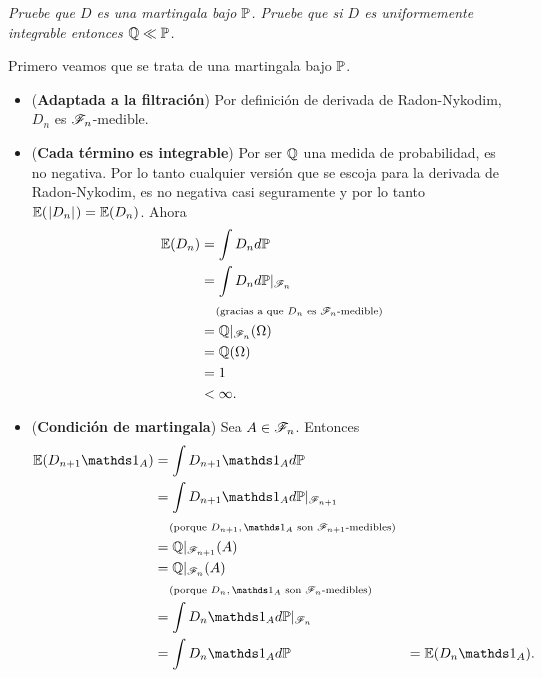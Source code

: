 \emph{
	Pruebe que $D$ es una martingala bajo $\p$. Pruebe que si 
	$D$ es uniformemente integrable entonces $\q\ll\p$.
}

\afterstatement\pn

Primero veamos que se trata de una martingala bajo $\P$.

\begin{itemize}
	\item   (\textbf{Adaptada a la filtración})
        Por definición de derivada de Radon-Nykodim, $D_n$ es $\F_n$-medible.\pn
    
    \item   (\textbf{Cada término es integrable})
        Por ser $\Q$ una medida de probabilidad, es no negativa. Por lo tanto cualquier versión que se
        escoja para la derivada de Radon-Nykodim, es no negativa casi seguramente y por lo tanto
        $\E(\abs{D_n}) = \E(D_n)$. Ahora
        \begin{align}
            \E(D_n)     &=  \int D_n d\P                                    \\
                        &=  \int D_n d\P|_{\F_n}                            \\
                        &\comment{gracias a que $D_n$ es $\F_n$-medible}    \\
                        &=  \Q|_{\F_n}(\Omega)                              \\
                        &=  \Q(\Omega)                                      \\
                        &=  1                                               \\
                        &<  \infty.
        \end{align}\pn
        
    \item   (\textbf{Condición de martingala})
        Sea $A \in \F_n$. Entonces
        \begin{align}
            \E(D_{n+1} \indic_A)    &=  \int D_{n+1} \indic_A d\P                                       \\
                                    &=  \int D_{n+1} \indic_A d\P|_{\F_{n+1}}                           \\
                                    &\comment{porque $D_{n+1}, \indic_A$ son $\F_{n+1}$-medibles}       \\
                                    &=  \Q|_{\F_{n+1}}(A)                                               \\
                                    &=  \Q|_{\F_n}(A)                                                   \\
                                    &\comment{porque $D_n, \indic_A$ son $\F_n$-medibles}               \\
                                    &=  \int D_n \indic_A d\P|_{\F_n}                                   \\
                                    &=  \int D_n \indic_A d\P                                           
                                    &=  \E(D_n \indic_A).   
        \end{align}
        

\end{itemize}

